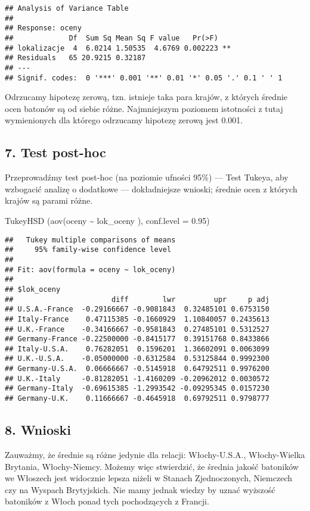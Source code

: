 \documentclass[
]{article}
\newenvironment{Shaded}{\begin{snugshade}}{\end{snugshade}}
\newcommand{\AttributeTok}[1]{\textcolor[rgb]{0.77,0.63,0.00}{#1}}
\newcommand{\FloatTok}[1]{\textcolor[rgb]{0.00,0.00,0.81}{#1}}
\newcommand{\FunctionTok}[1]{\textcolor[rgb]{0.00,0.00,0.00}{#1}}
\newcommand{\NormalTok}[1]{#1}
\newcommand{\SpecialCharTok}[1]{\textcolor[rgb]{0.00,0.00,0.00}{#1}}
\begin{document}
\begin{verbatim}
## Analysis of Variance Table
## 
## Response: oceny
##             Df  Sum Sq Mean Sq F value   Pr(>F)   
## lokalizacje  4  6.0214 1.50535  4.6769 0.002223 **
## Residuals   65 20.9215 0.32187                    
## ---
## Signif. codes:  0 '***' 0.001 '**' 0.01 '*' 0.05 '.' 0.1 ' ' 1
\end{verbatim}

Odrzucamy hipotezę zerową, tzn. istnieje taka para krajów, z których
średnie ocen batonów są od siebie różne. Najmniejszym poziomem
istotności z tutaj wymienionych dla którego odrzucamy hipotezę zerową
jest 0.001.

\hypertarget{test-post-hoc-1}{%
\subsection{7. Test post-hoc}\label{test-post-hoc-1}}

Przeprowadźmy test post-hoc (na poziomie ufności 95\%) --- Test Tukeya,
aby wzbogacić analizę o dodatkowe --- dokładniejsze wnioski; średnie
ocen z których krajów są parami różne.

\begin{Shaded}
\begin{Highlighting}[]
\FunctionTok{TukeyHSD}\NormalTok{ (}\FunctionTok{aov}\NormalTok{(oceny }\SpecialCharTok{\textasciitilde{}}\NormalTok{ lok\_oceny ), }\AttributeTok{conf.level =} \FloatTok{0.95}\NormalTok{)}
\end{Highlighting}
\end{Shaded}

\begin{verbatim}
##   Tukey multiple comparisons of means
##     95% family-wise confidence level
## 
## Fit: aov(formula = oceny ~ lok_oceny)
## 
## $lok_oceny
##                       diff        lwr         upr     p adj
## U.S.A.-France  -0.29166667 -0.9081843  0.32485101 0.6753150
## Italy-France    0.47115385 -0.1660929  1.10840057 0.2435613
## U.K.-France    -0.34166667 -0.9581843  0.27485101 0.5312527
## Germany-France -0.22500000 -0.8415177  0.39151768 0.8433866
## Italy-U.S.A.    0.76282051  0.1596201  1.36602091 0.0063099
## U.K.-U.S.A.    -0.05000000 -0.6312584  0.53125844 0.9992300
## Germany-U.S.A.  0.06666667 -0.5145918  0.64792511 0.9976200
## U.K.-Italy     -0.81282051 -1.4160209 -0.20962012 0.0030572
## Germany-Italy  -0.69615385 -1.2993542 -0.09295345 0.0157230
## Germany-U.K.    0.11666667 -0.4645918  0.69792511 0.9798777
\end{verbatim}

\hypertarget{wnioski-1}{%
\subsection{8. Wnioski}\label{wnioski-1}}

Zauważmy, że średnie są różne jedynie dla relacji: Włochy-U.S.A.,
Włochy-Wielka Brytania, Włochy-Niemcy. Możemy więc stwierdzić, że
średnia jakość batoników we Włoszech jest widocznie lepsza niżeli w
Stanach Zjednoczonych, Niemczech czy na Wyspach Brytyjskich. Nie mamy
jednak wiedzy by uznać wyższość batoników z Włoch ponad tych
pochodzących z Francji.
\end{document}
